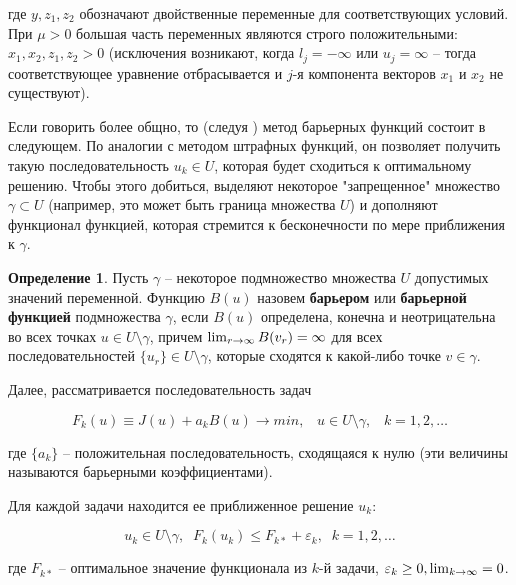 \documentclass[a4paper, 12pt, titlepage]{article}
\theoremstyle{definition}
\newtheorem{SmartDefinition}{Определение}
\theoremstyle{plain}
\theoremstyle{plain}
\begin{document}
где $y, z_{1}, z_{2}$ обозначают двойственные переменные для соответствующих
условий. При $\mu > 0$ большая часть переменных являются строго положительными:
$x_{1}, x_{2}, z_{1}, z_{2} > 0$ (исключения возникают, когда $l_{j} = -\infty$
или $u_{j} = \infty$ -- тогда соответствующее уравнение отбрасывается и
$j$-я компонента векторов $x_{1}$ и $x_{2}$ не существуют).

Если говорить более общно, то (следуя \cite{Vasilev1980}) метод барьерных
функций состоит в следующем. По аналогии с методом штрафных функций, он
позволяет получить такую последовательность $u_{k} \in U$, которая будет
сходиться к оптимальному решению. Чтобы этого добиться, выделяют некоторое
"запрещенное" множество $\gamma \subset U$ (например, это может быть граница
множества $U$) и дополняют функционал функцией, которая стремится к
бесконечности по мере приближения к $\gamma$.

\begin{SmartDefinition}
 Пусть $\gamma$ -- некоторое подмножество множества $U$ допустимых значений
 переменной. Функцию $B(u)$ назовем \textbf{барьером} или \textbf{барьерной
 функцией} подмножества $\gamma$, если $B(u)$ определена, конечна и 
 неотрицательна во всех точках $u \in U \setminus \gamma$, причем
 $\operatornamewithlimits{lim}_{r \to \infty} B(v_{r}) = \infty$ для всех
 последовательностей $\{u_{r}\} \in U \setminus \gamma$, которые сходятся к
 какой-либо точке $v \in \gamma$.
\end{SmartDefinition}

Далее, рассматривается последовательность задач

\begin{equation}
 F_{k}(u) \equiv J(u) + a_{k} B(u) \to min, \;\;\; u \in U \setminus \gamma, 
\;\;\;
 k = 1, 2, \ldots
\end{equation}

где $\{a_{k}\}$ -- положительная последовательность, сходящаяся к нулю (эти 
величины называются барьерными коэффициентами).

Для каждой задачи находится ее приближенное решение $u_{k}$:

\begin{equation}
 u_{k} \in U \setminus \gamma, \;\; F_{k}(u_{k}) \leq F_{k*} + \varepsilon_{k},
 \;\; k = 1, 2, \ldots
\end{equation}

где $F_{k*}$ -- оптимальное значение функционала из $k$-й задачи,
$\varepsilon_{k} \geq 0, \operatornamewithlimits{lim}_{k \to \infty} = 0$.
\end{document}

